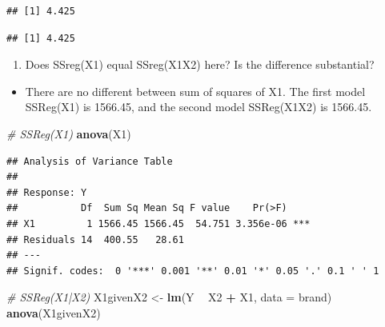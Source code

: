\documentclass[
]{article}
\newenvironment{Shaded}{\begin{snugshade}}{\end{snugshade}}
\newcommand{\CommentTok}[1]{\textcolor[rgb]{0.56,0.35,0.01}{\textit{#1}}}
\newcommand{\DataTypeTok}[1]{\textcolor[rgb]{0.13,0.29,0.53}{#1}}
\newcommand{\DecValTok}[1]{\textcolor[rgb]{0.00,0.00,0.81}{#1}}
\newcommand{\KeywordTok}[1]{\textcolor[rgb]{0.13,0.29,0.53}{\textbf{#1}}}
\newcommand{\NormalTok}[1]{#1}
\newcommand{\OperatorTok}[1]{\textcolor[rgb]{0.81,0.36,0.00}{\textbf{#1}}}
\newcommand{\StringTok}[1]{\textcolor[rgb]{0.31,0.60,0.02}{#1}}
\providecommand{\tightlist}{%
  \setlength{\itemsep}{0pt}\setlength{\parskip}{0pt}}
\begin{document}
\begin{verbatim}
## [1] 4.425
\end{verbatim}

\begin{Shaded}
\end{Shaded}

\begin{verbatim}
## [1] 4.425
\end{verbatim}

\begin{enumerate}
\def\labelenumi{(\alph{enumi})}
\setcounter{enumi}{4}
\tightlist
\item
  Does SSreg(X1) equal SSreg(X1\textbar X2) here? Is the difference
  substantial?
\end{enumerate}

\begin{itemize}
\tightlist
\item
  There are no different between sum of squares of X1. The first model
  SSReg(X1) is 1566.45, and the second model SSReg(X1\textbar X2) is
  1566.45.
\end{itemize}

\begin{Shaded}
\begin{Highlighting}[]
\CommentTok{# SSReg(X1)}
\KeywordTok{anova}\NormalTok{(X1)}
\end{Highlighting}
\end{Shaded}

\begin{verbatim}
## Analysis of Variance Table
## 
## Response: Y
##           Df  Sum Sq Mean Sq F value    Pr(>F)    
## X1         1 1566.45 1566.45  54.751 3.356e-06 ***
## Residuals 14  400.55   28.61                      
## ---
## Signif. codes:  0 '***' 0.001 '**' 0.01 '*' 0.05 '.' 0.1 ' ' 1
\end{verbatim}

\begin{Shaded}
\begin{Highlighting}[]
\CommentTok{# SSReg(X1|X2)}
\NormalTok{X1givenX2 <-}\StringTok{ }\KeywordTok{lm}\NormalTok{(Y }\OperatorTok{~}\StringTok{ }\NormalTok{X2 }\OperatorTok{+}\StringTok{ }\NormalTok{X1, }\DataTypeTok{data =}\NormalTok{ brand)}
\KeywordTok{anova}\NormalTok{(X1givenX2)}
\end{Highlighting}
\end{Shaded}
\end{document}
